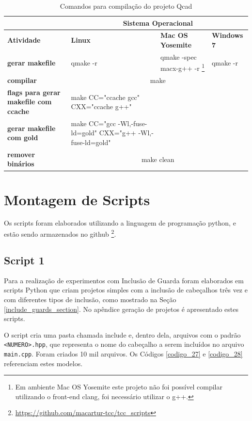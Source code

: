 \begin{itemize}
\begin{table}[h]
\begin{tabular}{p{3cm}p{5cm}p{5cm}p{5cm}}
\toprule
 & \multicolumn{3}{c}{Sistema Operacional} \\ \toprule 
\textbf{Atividade} & \textbf{Linux} & \textbf{Mac OS Yosemite} & \textbf{Windows 7}  \\ \midrule 
\textbf{gerar makefile} & qmake -r & qmake -spec macx-g++ -r  
\footnote{Em ambiente Mac OS Yosemite este projeto não foi possível compilar
 utilizando o front-end clang, foi necessário utilizar o g++.} &  qmake -r  \\ \midrule
\textbf{compilar} & \multicolumn{3}{c}{make } \\ \midrule
\textbf{flags para gerar makefile com ccache} &  make CC="ccache gcc" CXX="ccache g++" \\ \midrule
\textbf{gerar makefile com gold} & make  CC="gcc -Wl,-fuse-ld=gold" CXX="g++ -Wl,-fuse-ld=gold" \\ \midrule
\textbf{remover binários} & \multicolumn{3}{c}{make clean} \\ \bottomrule
\end{tabular} 
\caption{Comandos para compilação do projeto Qcad}
\label{t_compilacao_qcad}
\end{table}

\end{itemize}


\section{Montagem de Scripts}


Os scripts foram elaborados utilizando a linguagem de programação python,
 e estão sendo armazenados no github
\footnote{\url{https://github.com/macartur-tcc/tcc_scripts}}.


\subsection{Script 1}\label{script_1}

Para a realização de experimentos com Inclusão de Guarda foram elaborados
 em scripts Python que criam projetos simples com a inclusão de cabeçalhos
 três vez e com diferentes tipos de inclusão, como mostrado na  Seção
 \ref{include_guards_section}.
 No apêndice geração de projetos é apresentado estes scripts.

O script cria uma pasta chamada include e, dentro dela, arquivos com o padrão
 \texttt{<NUMERO>.hpp}, que representa o nome do cabeçalho a serem incluídos no arquivo 
\texttt{main.cpp}.
 Foram criados 10 mil arquivos. Os Códigos \ref{codigo_27} e  \ref{codigo_28}
 referenciam estes modelos.



